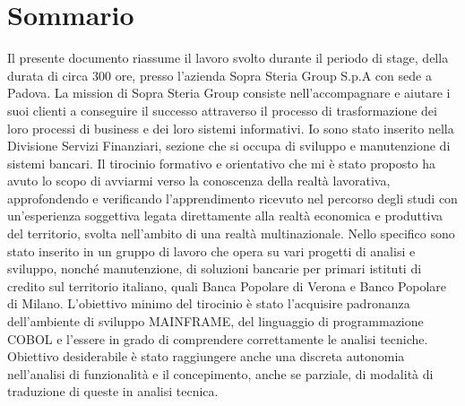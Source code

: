 
\cleardoublepage
{}
{}
\begingroup
\let\clearpage\relax
\let\cleardoublepage\relax
\let\cleardoublepage\relax

\chapter*{Sommario}

Il presente documento riassume il lavoro svolto durante il periodo di stage, della durata di circa 300 ore, presso l’azienda Sopra Steria Group S.p.A con sede a Padova.
La mission di Sopra Steria Group consiste nell'accompagnare e aiutare i suoi clienti a conseguire il successo attraverso il processo di trasformazione dei loro processi di business e dei loro sistemi informativi.
Io sono stato inserito nella Divisione Servizi Finanziari, sezione che si occupa di sviluppo e manutenzione di sistemi bancari.
Il tirocinio formativo e orientativo che mi è stato proposto ha avuto lo scopo di avviarmi verso la conoscenza della realtà lavorativa, approfondendo e verificando l'apprendimento ricevuto nel percorso degli studi con un'esperienza soggettiva legata direttamente alla realtà economica e produttiva del territorio, svolta nell'ambito di una realtà multinazionale.
Nello specifico sono stato inserito in un gruppo di lavoro che opera su vari progetti di analisi e sviluppo, nonché manutenzione, di soluzioni bancarie per primari istituti di credito sul territorio italiano, quali Banca Popolare di Verona e Banco Popolare di Milano.
L’obiettivo minimo del tirocinio è stato l'acquisire padronanza dell'ambiente di sviluppo MAINFRAME, del linguaggio di programmazione COBOL e l'essere in grado di comprendere correttamente le analisi tecniche.
Obiettivo desiderabile è stato raggiungere anche una discreta autonomia nell'analisi di funzionalità e il concepimento, anche se parziale, di modalità di traduzione di queste in analisi tecnica.

%
%

\endgroup			

\vfill

